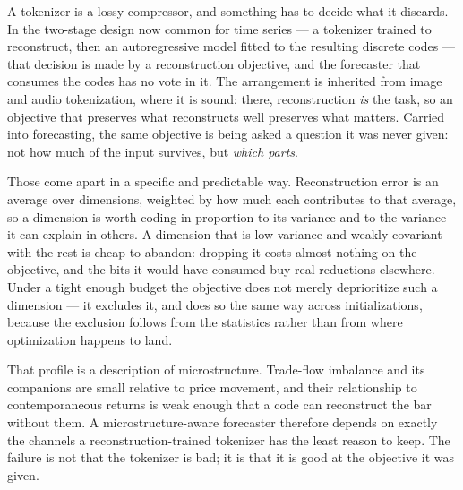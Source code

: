 %

A tokenizer is a lossy compressor, and something has to decide what it discards. In the two-stage
design now common for time series --- a tokenizer trained to reconstruct, then an autoregressive
model fitted to the resulting discrete codes --- that decision is made by a reconstruction
objective, and the forecaster that consumes the codes has no vote in it. The arrangement is
inherited from image and audio tokenization, where it is sound: there, reconstruction \emph{is} the
task, so an objective that preserves what reconstructs well preserves what matters. Carried into
forecasting, the same objective is being asked a question it was never given: not how much of the
input survives, but \emph{which parts}.

Those come apart in a specific and predictable way. Reconstruction error is an average over
dimensions, weighted by how much each contributes to that average, so a dimension is worth coding
in proportion to its variance and to the variance it can explain in others. A dimension that is
low-variance and weakly covariant with the rest is cheap to abandon: dropping it costs almost
nothing on the objective, and the bits it would have consumed buy real reductions elsewhere. Under
a tight enough budget the objective does not merely deprioritize such a dimension --- it excludes
it, and does so the same way across initializations, because the exclusion follows from the
statistics rather than from where optimization happens to land.

That profile is a description of microstructure. Trade-flow imbalance and its companions are small
relative to price movement, and their relationship to contemporaneous returns is weak enough that a
code can reconstruct the bar without them. A microstructure-aware forecaster therefore depends on
exactly the channels a reconstruction-trained tokenizer has the least reason to keep. The failure
is not that the tokenizer is bad; it is that it is good at the objective it was given.

